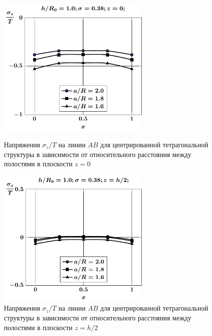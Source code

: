 \begin{figure}[h!]
\centering\footnotesize
\parbox[b]{7.5cm}{\centering\includegraphics[width=7.5cm]{cav5-a-h10-r10-z0-sig_z.pdf}
\caption{Напряжения $\sigma_z/T$ на линии $AB$ для центрированной тетрагональной структуры в зависимости от относительного расстояния между полостями в плоскости $z=0$ 
\label{f:7:99}}}\hfil\hfil
\parbox[b]{7.5cm}{\centering\includegraphics[width=7.5cm]{cav5-a-h10-r10-z1-sig_z.pdf}
\caption{Напряжения $\sigma_z/T$ на линии $AB$ для центрированной тетрагональной структуры в зависимости от относительного расстояния между полостями в плоскости $z=h/2$
\label{f:7:100}}}
\end{figure}

